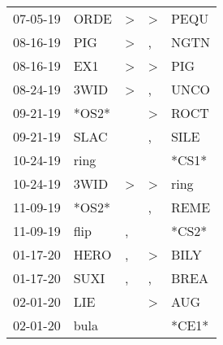 \begin{supertabular}{p{0.07\textwidth}p{0.06\textwidth}p{0.02\textwidth}p{0.02\textwidth}p{0.06\textwidth}}
          07-05-19\textsuperscript{} &           ORDE\textsuperscript{} &     \textgreater &     \textgreater &           PEQU\textsuperscript{} \\
          08-16-19\textsuperscript{} &            PIG\textsuperscript{} &     \textgreater &                , &           NGTN\textsuperscript{} \\
          08-16-19\textsuperscript{} &            EX1\textsuperscript{} &     \textgreater &     \textgreater &            PIG\textsuperscript{} \\
          08-24-19\textsuperscript{} &           3WID\textsuperscript{} &     \textgreater &                , &           UNCO\textsuperscript{} \\
          09-21-19\textsuperscript{} &                            *OS2* &                  &     \textgreater &           ROCT\textsuperscript{} \\
          09-21-19\textsuperscript{} &           SLAC\textsuperscript{} &                  &                , &           SILE\textsuperscript{} \\
          10-24-19\textsuperscript{} &           ring\textsuperscript{} &                  &                  &                            *CS1* \\
          10-24-19\textsuperscript{} &           3WID\textsuperscript{} &     \textgreater &     \textgreater &           ring\textsuperscript{} \\
          11-09-19\textsuperscript{} &                            *OS2* &                  &                , &           REME\textsuperscript{} \\
          11-09-19\textsuperscript{} &           flip\textsuperscript{} &                , &                  &                            *CS2* \\
          01-17-20\textsuperscript{} &           HERO\textsuperscript{} &                , &     \textgreater &           BILY\textsuperscript{} \\
          01-17-20\textsuperscript{} &           SUXI\textsuperscript{} &                , &                , &           BREA\textsuperscript{} \\
          02-01-20\textsuperscript{} &            LIE\textsuperscript{} &                  &     \textgreater &            AUG\textsuperscript{} \\
          02-01-20\textsuperscript{} &           bula\textsuperscript{} &                  &                  &                            *CE1* \\

\end{supertabular}

